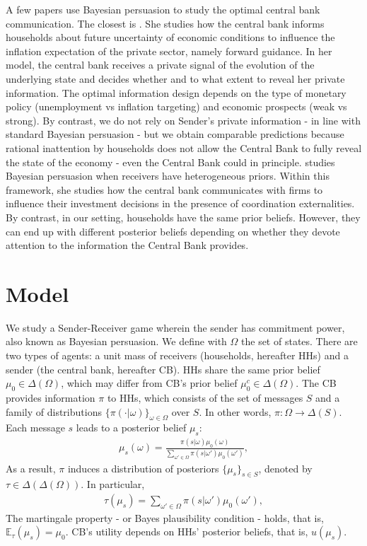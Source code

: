 \documentclass[12pt,a4paper]{article}
\begin{document}
A few papers use Bayesian persuasion to study the optimal central bank communication. The closest is \cite{Ko2022}. She studies how the central bank informs households about future uncertainty of economic conditions to influence the inflation expectation of the private sector, namely forward guidance. In her model, the central bank receives a private signal of the evolution of the underlying state and decides whether and to what extent to reveal her private information. The optimal information design depends on the type of monetary policy (unemployment vs inflation targeting) and economic prospects (weak vs strong). By contrast, we do not rely on Sender's private information - in line with standard Bayesian persuasion - but we obtain comparable predictions because rational inattention by households does not allow the Central Bank to fully reveal the state of the economy - even the Central Bank could in principle.
\cite{Herbert2021} studies Bayesian persuasion when receivers have heterogeneous priors. Within this framework, she studies how the central bank communicates with firms to influence their investment decisions in the presence of coordination externalities. By contrast, in our setting, households have the same prior beliefs. However, they can end up with different posterior beliefs depending on whether they devote attention to the information the Central Bank provides.

\section{Model}

We study a Sender-Receiver game wherein the sender has commitment power, also known as Bayesian persuasion. We define with $\Omega$ the set of states. There are two types of agents: a unit mass of receivers (households, hereafter HHs) and a sender (the central bank, hereafter CB). HHs share the same prior belief $\mu_0 \in \Delta(\Omega)$, which may differ from CB's prior belief $\mu_0^c \in \Delta(\Omega)$.
The CB provides information $\pi$ to HHs, which consists of the set of messages $S$ and a family of distributions $\{\pi(\cdot|\omega)\}_{\omega\in\Omega}$ over $S$. In other words, $\pi: \Omega \to \Delta(S)$. Each message $s$ leads to a posterior belief $\mu_s$:
\begin{align}
    \mu_s(\omega) = \frac{\pi(s|\omega)\mu_0(\omega)}{\sum_{\omega'\in\Omega}\pi(s|\omega')\mu_0(\omega')},
\end{align}
As a result, $\pi$ induces a distribution of posteriors $\{\mu_s\}_{s \in S}$, denoted by $\tau \in \Delta(\Delta(\Omega))$. In particular, 
\begin{align}
\label{tau}
    \tau(\mu_s) = \sum_{\omega'\in\Omega}\pi(s|\omega')\mu_0(\omega'),
\end{align}
The martingale property - or Bayes plausibility condition - holds, that is, $\mathbb{E}_{\tau}(\mu_s)=\mu_0$. CB's utility depends on HHs' posterior beliefs, that is, $u(\mu_s)$.
\end{document}
